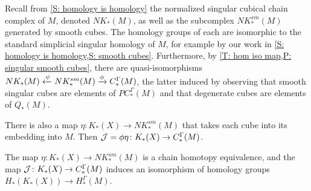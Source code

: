 Recall from \cref{S: homology is homology} the normalized singular cubical chain complex of $M$, denoted $NK_*(M)$, as well as the subcomplex $NK^{sm}_*(M)$ generated by smooth cubes.
The homology groups of each are isomorphic to the standard simplicial singular homology of $M$, for example by our work in \cref{S: homology is homology,S: smooth cubes}.
Furthermore, by \cref{T: hom iso map,P: singular smooth cubes}, there are quasi-isomorphisms $NK_*(M) \xleftarrow{\psi} NK^{sm}_*(M) \xrightarrow{\phi} C^\Gamma_*(M)$, the latter induced by observing that smooth singular cubes are elements of $PC^\Gamma_*(M)$ and that degenerate cubes are elements of $Q_*(M)$.

There is also a map $\eta: K_*(X) \to NK^{sm}_*(M)$ that takes each cube into its embedding into $M$.
Then $\mathcal{J} = \phi\eta \colon K_*(X) \to C^\Gamma_*(M)$.


\begin{theorem}\label{T: cubical homology iso}
	The map $\eta: K_*(X) \to NK^{sm}_*(M)$ is a chain homotopy equivalence, and the map $\mathcal{J} \colon K_*(X) \to C^\Gamma_*(M)$ induces an isomorphism of homology groups $H_*(K_*(X)) \to H_*^\Gamma(M)$.
\end{theorem}

